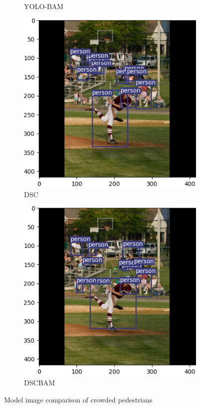 \begin{figure}[!htbp]
\begin{subfigure}{.2\textwidth}
  \caption{YOLO-BAM}
  \label{fig:cbambaseball}
\end{subfigure}%
\begin{subfigure}{.2\textwidth}
  \centering
  \includegraphics[width=\textwidth]{images/DSC_baseball.png}
  \caption{DSC}
  \label{fig:dscbaseball}
\end{subfigure}%
\begin{subfigure}{.2\textwidth}
  \centering
  \includegraphics[width=\textwidth]{images/DSCBAM_baseball.png}
  \caption{DSCBAM}
  \label{fig:dscbambaseball}
\end{subfigure}
\caption{Model image comparison of crowded pedestrians}
\label{fig:baseball}
\end{figure}

